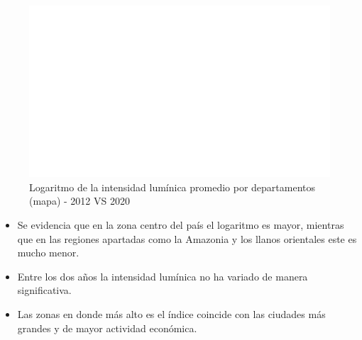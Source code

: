     \begin{figure}[H]
        \caption{Logaritmo de la intensidad lumínica promedio por departamentos (mapa) - 2012 VS 2020 \label{map_result_2} }
        \begin{center}
        \includegraphics[width=\textwidth,keepaspectratio]{img/var_301_map.png}
        \end{center}
    \end{figure}
            \begin{itemize}
                    \item Se evidencia que en la zona centro del país el logaritmo es mayor, mientras que en las regiones apartadas como la Amazonia y los llanos orientales este es mucho menor.
                    \item Entre los dos años la intensidad lumínica no ha variado de manera significativa.
                    \item Las zonas en donde más alto es el índice coincide con las ciudades más grandes y de mayor actividad económica.
                    \end{itemize}


